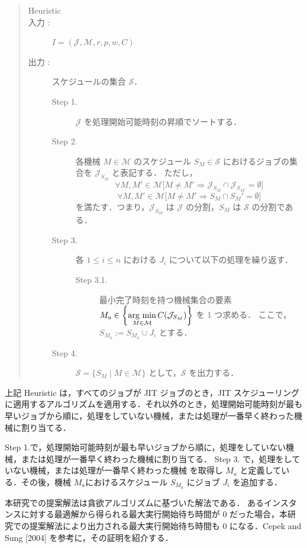 \documentclass[12pt]{optlab-bachelor}
\newcommand{\argmin}{\mathop{\rm arg~min}\limits}
\begin{document}
\begin{quote}
  \begin{description}
    \item[{\sc Heuristic}]
    \item[入力 :] $I = (\mathcal{J}, \mathcal{M},r,p,w,C)$
    \item[出力 :] スケジュールの集合 $\mathcal{S}$．
    \begin{description}
      \item[Step 1.]
      $\mathcal{J}$ を処理開始可能時刻の昇順でソートする．
      \item[Step 2.]
      各機械 $M \in \mathcal{M}$ のスケジュール $S_M \in \mathcal{S}$ におけるジョブの集合を $\mathcal{J}_{S_M}$ と表記する．
      ただし，
      $$\forall M, M' \in \mathcal{M}\big[M \neq M' \Rightarrow \mathcal{J}_{S_M} \cap \mathcal{J}_{S_{M'}} = \emptyset \big]$$
      $$\forall M, M' \in \mathcal{M}\big[M \neq M' \Rightarrow S_M \cap S_M' = \emptyset \big]$$
      を満たす．つまり，$\mathcal{J}_{S_M}$ は $\mathcal{J}$ の分割，$S_M$ は $\mathcal{S}$ の分割である．
      \item[Step 3.]
      各 $1 \le i \le n$ における $J_i$ について以下の処理を繰り返す．
      \begin{description}
        \item[Step 3.1.] 最小完了時刻を持つ機械集合の要素 $M_a \in \left\{ \displaystyle \argmin_{M \in \mathcal{M}}C(\mathcal{J}_{S_M})\right\}$ を 1 つ求める．
        ここで，$S_{M_a} := S_{M_a} \cup J_i$ とする．
      \end{description}
      \item[Step 4.]
      $\mathcal{S} = \{ S_M \mid M \in \mathcal{M}\}$ として，$\mathcal{S}$ を出力する．
    \end{description}
  \end{description}
\end{quote}

上記 {\sc Heuristic} は，すべてのジョブが JIT ジョブのとき，JIT スケジューリングに適用するアルゴリズムを適用する．それ以外のとき，処理開始可能時刻が最も早いジョブから順に，処理をしていない機械，または処理が一番早く終わった機械に割り当てる．

Step 1.で，処理開始可能時刻が最も早いジョブから順に，処理をしていない機械，または処理が一番早く終わった機械に割り当てる．
Step 3. で，処理をしていない機械，または処理が一番早く終わった機械 を取得し $M_a$ と定義している．その後，機械 $M_a$におけるスケジュール $S_{M_a}$ にジョブ $J_i$ を追加する．

本研究での提案解法は貪欲アルゴリズムに基づいた解法である．
あるインスタンスに対する最適解から得られる最大実行開始待ち時間が 0 だった場合，本研究での提案解法により出力される最大実行開始待ち時間も 0 になる．Cepek and Sung [2004] \cite{JIT} を参考に，その証明を紹介する．
\end{document}
